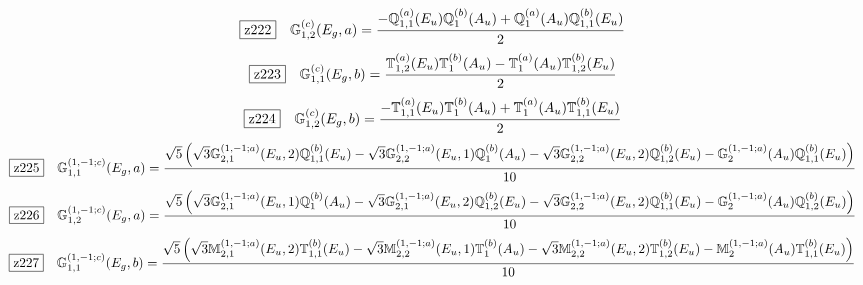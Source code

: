 \documentclass[fleqn,10pt,landscape]{jsarticle}
\begin{document}
\begin{dmath*}
\hspace*{3mm}\fbox{z222}\quad \mathbb{G}_{1,2}^{(c)}(E_{g},a)=\frac{- \mathbb{Q}_{1,1}^{(a)}(E_{u}) \mathbb{Q}_{1}^{(b)}(A_{u}) + \mathbb{Q}_{1}^{(a)}(A_{u}) \mathbb{Q}_{1,1}^{(b)}(E_{u})}{2}
\end{dmath*}
\begin{dmath*}
\hspace*{3mm}\fbox{z223}\quad \mathbb{G}_{1,1}^{(c)}(E_{g},b)=\frac{\mathbb{T}_{1,2}^{(a)}(E_{u}) \mathbb{T}_{1}^{(b)}(A_{u}) - \mathbb{T}_{1}^{(a)}(A_{u}) \mathbb{T}_{1,2}^{(b)}(E_{u})}{2}
\end{dmath*}
\begin{dmath*}
\hspace*{3mm}\fbox{z224}\quad \mathbb{G}_{1,2}^{(c)}(E_{g},b)=\frac{- \mathbb{T}_{1,1}^{(a)}(E_{u}) \mathbb{T}_{1}^{(b)}(A_{u}) + \mathbb{T}_{1}^{(a)}(A_{u}) \mathbb{T}_{1,1}^{(b)}(E_{u})}{2}
\end{dmath*}
\begin{dmath*}
\hspace*{3mm}\fbox{z225}\quad \mathbb{G}_{1,1}^{(1,-1;c)}(E_{g},a)=\frac{\sqrt{5} \left(\sqrt{3} \mathbb{G}_{2,1}^{(1,-1;a)}(E_{u},2) \mathbb{Q}_{1,1}^{(b)}(E_{u}) - \sqrt{3} \mathbb{G}_{2,2}^{(1,-1;a)}(E_{u},1) \mathbb{Q}_{1}^{(b)}(A_{u}) - \sqrt{3} \mathbb{G}_{2,2}^{(1,-1;a)}(E_{u},2) \mathbb{Q}_{1,2}^{(b)}(E_{u}) - \mathbb{G}_{2}^{(1,-1;a)}(A_{u}) \mathbb{Q}_{1,1}^{(b)}(E_{u})\right)}{10}
\end{dmath*}
\begin{dmath*}
\hspace*{3mm}\fbox{z226}\quad \mathbb{G}_{1,2}^{(1,-1;c)}(E_{g},a)=\frac{\sqrt{5} \left(\sqrt{3} \mathbb{G}_{2,1}^{(1,-1;a)}(E_{u},1) \mathbb{Q}_{1}^{(b)}(A_{u}) - \sqrt{3} \mathbb{G}_{2,1}^{(1,-1;a)}(E_{u},2) \mathbb{Q}_{1,2}^{(b)}(E_{u}) - \sqrt{3} \mathbb{G}_{2,2}^{(1,-1;a)}(E_{u},2) \mathbb{Q}_{1,1}^{(b)}(E_{u}) - \mathbb{G}_{2}^{(1,-1;a)}(A_{u}) \mathbb{Q}_{1,2}^{(b)}(E_{u})\right)}{10}
\end{dmath*}
\begin{dmath*}
\hspace*{3mm}\fbox{z227}\quad \mathbb{G}_{1,1}^{(1,-1;c)}(E_{g},b)=\frac{\sqrt{5} \left(\sqrt{3} \mathbb{M}_{2,1}^{(1,-1;a)}(E_{u},2) \mathbb{T}_{1,1}^{(b)}(E_{u}) - \sqrt{3} \mathbb{M}_{2,2}^{(1,-1;a)}(E_{u},1) \mathbb{T}_{1}^{(b)}(A_{u}) - \sqrt{3} \mathbb{M}_{2,2}^{(1,-1;a)}(E_{u},2) \mathbb{T}_{1,2}^{(b)}(E_{u}) - \mathbb{M}_{2}^{(1,-1;a)}(A_{u}) \mathbb{T}_{1,1}^{(b)}(E_{u})\right)}{10}
\end{dmath*}
\end{document}
